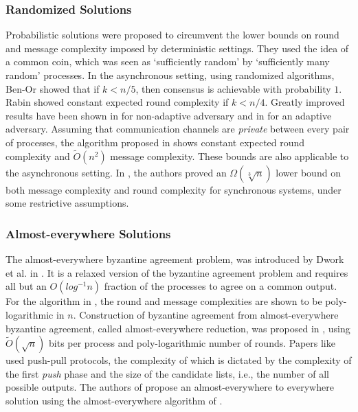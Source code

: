 \subsubsection{Randomized Solutions}
Probabilistic solutions were proposed to circumvent the lower bounds on round and message complexity imposed by deterministic settings. They used the idea of a common coin, which was seen as `sufficiently random' by `sufficiently many random' processes. 
In the asynchronous setting, using randomized algorithms, Ben-Or \cite{Ben-Or83} showed that if $k < n/5$, then consensus is achievable with probability $1$. Rabin \cite{Rabin83} showed constant expected round complexity if $k < n/4$. Greatly improved results have been shown in \cite{PCR14, KKKSS08, MHR14} for non-adaptive adversary and in \cite{KS13,AAKS14} for an adaptive adversary. Assuming that communication channels are \textit{private} between every pair of processes, the algorithm proposed in \cite{PR10} shows constant expected round complexity and $\tilde{O}(n^2)$ message complexity. These bounds are also applicable to the asynchronous setting. In \cite{HKK08}, the authors proved an $\Omega(\sqrt[3]{n})$ lower bound on both message complexity and round complexity for synchronous systems, under some restrictive assumptions.

\subsubsection{Almost-everywhere Solutions}
The almost-everywhere byzantine agreement problem, was introduced by Dwork et al. in \cite{DPPU88}. It is a relaxed version of the byzantine agreement problem and requires all but an $O(log^{-1}n)$ fraction of the processes to agree on a common output. For the algorithm in \cite{KSSV06}, the round and message complexities are shown to be poly-logarithmic in $n$. Construction of byzantine agreement from almost-everywhere byzantine agreement, called almost-everywhere reduction, was proposed in \cite{KS09,KLST11}, using $\tilde{O}(\sqrt{n})$ bits per process and poly-logarithmic number of rounds. 
Papers like \cite{KLST11} used push-pull protocols, the complexity of which is dictated by the complexity of the first \textit{push} phase and the size of the candidate lists, i.e., the number of all possible outputs. The authors of \cite{BGH13} propose an almost-everywhere to everywhere solution using the almost-everywhere algorithm of \cite{KSSV06}.

